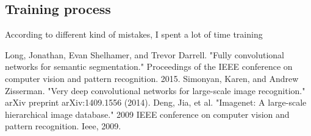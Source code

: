 \documentclass[transmag]{IEEEtran}
\begin{document}
\subsection{Training process}
According to different kind of mistakes, I spent a lot of time training 








\begin{thebibliography}{00}
 Long, Jonathan, Evan Shelhamer, and Trevor Darrell. "Fully convolutional networks for semantic segmentation." Proceedings of the IEEE conference on computer vision and pattern recognition. 2015.
 Simonyan, Karen, and Andrew Zisserman. "Very deep convolutional networks for large-scale image recognition." arXiv preprint arXiv:1409.1556 (2014).
 Deng, Jia, et al. "Imagenet: A large-scale hierarchical image database." 2009 IEEE conference on computer vision and pattern recognition. Ieee, 2009.
\end{thebibliography}
\end{document}
